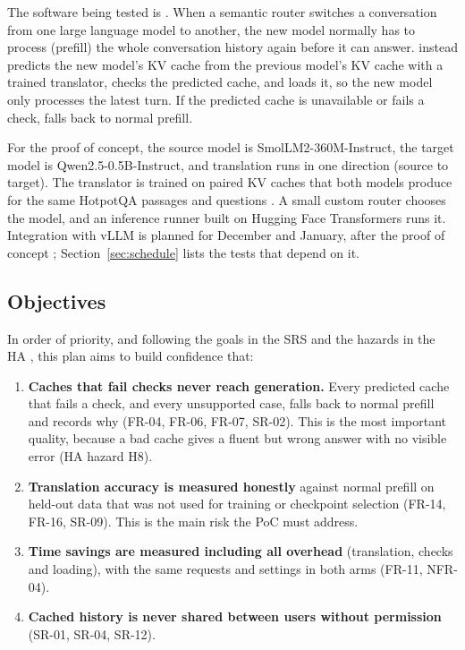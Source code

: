 \documentclass[12pt, titlepage]{article}
\begin{document}
The software being tested is \progname{}. When a semantic router switches a
conversation from one large language model to another, the new model
normally has to process (prefill) the whole conversation history again
before it can answer. \progname{} instead predicts the new model's KV cache
from the previous model's KV cache with a trained translator, checks the
predicted cache, and loads it, so the new model only processes the latest
turn. If the predicted cache is unavailable or fails a check, \progname{}
falls back to normal prefill.

For the proof of concept, the source model is SmolLM2-360M-Instruct, the
target model is Qwen2.5-0.5B-Instruct, and translation runs in one
direction (source to target). The translator is trained on paired KV caches
that both models produce for the same HotpotQA passages and questions
\citep{Yang2018HotpotQA}. A small custom router chooses the model, and an
inference runner built on Hugging Face Transformers runs it. Integration
with vLLM is planned for December and January, after the proof of concept
\citep{TandemDevPlan}; Section~\ref{sec:schedule} lists the tests that
depend on it.

\subsection{Objectives}

In order of priority, and following the goals in the SRS
\citep[Section~1.2]{TandemSRS} and the hazards in the HA
\citep[Section~5]{TandemHA}, this plan aims to build confidence that:

\begin{enumerate}
  \item \textbf{Caches that fail checks never reach generation.} Every
  predicted cache that fails a check, and every unsupported case, falls
  back to normal prefill and records why (FR-04, FR-06, FR-07, SR-02).
  This is the most important quality, because a bad cache gives a fluent
  but wrong answer with no visible error (HA hazard H8).
  \item \textbf{Translation accuracy is measured honestly} against normal
  prefill on held-out data that was not used for training or checkpoint
  selection (FR-14, FR-16, SR-09). This is the main risk the PoC must
  address.
  \item \textbf{Time savings are measured including all overhead}
  (translation, checks and loading), with the same requests and settings in
  both arms (FR-11, NFR-04).
  \item \textbf{Cached history is never shared between users without
  permission} (SR-01, SR-04, SR-12).
\end{enumerate}
\end{document}
